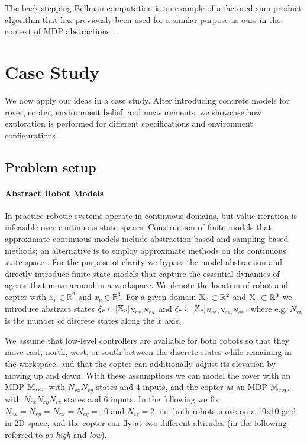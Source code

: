 \documentclass[conference]{IEEEtran}
\renewcommand{\cite}[1]{\citep{#1}}
\begin{document}
The back-stepping Bellman computation is an example of a factored sum-product algorithm \cite{Kschischang2001} that has previously been used for a similar purpose as ours in the context of MDP abstractions \cite{EsmaeilZadehSoudjani2017}.



\section{Case Study}
\label{sec:casestudy}

We now apply our ideas in a case study. After introducing concrete models for rover, copter, environment belief, and measurements, we showcase how exploration is performed for different specifications and environment configurations.

\subsection{Problem setup}

\paragraph{Abstract Robot Models}

In practice robotic systems operate in continuous domains, but value iteration is infeasible over continuous state spaces. Construction of finite models that approximate continuous models include abstraction-based \cite{Zamani2015} and sampling-based \cite{Kavraki1996, Agha-mohammadi2014} methods; an alternative is to employ approximate methods on the continuous state space \cite{Powell2011}. For the purpose of clarity we bypass the model abstraction and directly introduce finite-state models that capture the essential dynamics of agents that move around in a workspace. We denote the location of robot and copter with $x_r \in \mathbb{R}^2$ and $x_c \in \mathbb{R}^3$. For a given domain $\mathbb{X}_r \subset \mathbb{R}^2$ and $\mathbb{X}_c \subset \mathbb{R}^3$ we introduce abstract states $\xi_r \in [\mathbb{X}_r]_{N_{rx}, N_{ry}}$ and $\xi_c \in [\mathbb{X}_c]_{N_{cx}, N_{cy}, N_{cz}}$, where e.g. $N_{rx}$ is the number of discrete states along the $x$ axis.

We assume that low-level controllers are available for both robots so that they move east, north, west, or south between the discrete states while remaining in the workspace, and that the copter can additionally adjust its elevation by moving up and down. With these assumptions we can model the rover with an MDP $\mathbb{M}_{rov}$ with $N_{rx} N_{ry}$ states and $4$ inputs, and the copter as an MDP $\mathbb{M}_{copt}$ with $N_{cx} N_{cy} N_{cz}$ states and $6$ inputs. In the following we fix $N_{rx} = N_{ry} = N_{cx} = N_{cy} = 10$ and $N_{cz} = 2$, i.e. both robots move on a 10x10 grid in 2D space, and the copter can fly at two different altitudes (in the following referred to as \emph{high} and \emph{low}).
\end{document}
